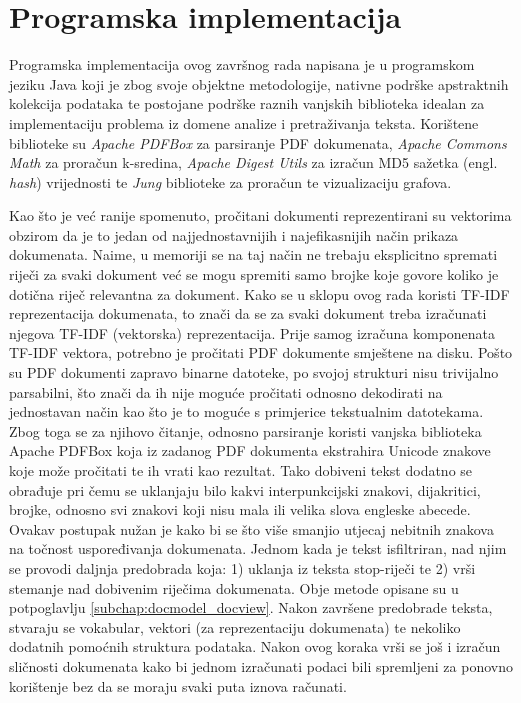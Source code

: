 \documentclass[times, utf8, zavrsni, numeric]{fer}
\begin{document}
\chapter{Programska implementacija}
\label{chap:impl}
Programska implementacija ovog završnog rada napisana je u programskom jeziku Java koji je zbog svoje objektne metodologije, nativne podrške apstraktnih kolekcija podataka te postojane podrške raznih vanjskih biblioteka idealan za implementaciju problema iz domene analize i pretraživanja teksta.
Korištene biblioteke su \textit{Apache PDFBox} za parsiranje PDF dokumenata, \textit{Apache Commons Math} za proračun k-sredina, \textit{Apache Digest Utils} za izračun MD5 sažetka (engl. \textit{hash}) vrijednosti te \textit{Jung} biblioteke za proračun te vizualizaciju grafova. \par
Kao što je već ranije spomenuto, pročitani dokumenti reprezentirani su vektorima obzirom da je to jedan od  najjednostavnijih i najefikasnijih način prikaza dokumenata. Naime, u memoriji se na taj način ne trebaju eksplicitno spremati riječi za svaki dokument već se mogu spremiti samo brojke koje govore koliko je dotična riječ relevantna za dokument. Kako se u sklopu ovog rada koristi TF-IDF reprezentacija dokumenata, to znači da se za svaki dokument treba izračunati njegova TF-IDF (vektorska) reprezentacija. Prije samog izračuna komponenata TF-IDF vektora, potrebno je pročitati PDF dokumente smještene na disku. Pošto su PDF dokumenti zapravo binarne datoteke, po svojoj strukturi nisu trivijalno parsabilni, što znači da ih nije moguće pročitati odnosno dekodirati na jednostavan način kao što je to moguće s primjerice tekstualnim datotekama. Zbog toga se za njihovo čitanje, odnosno parsiranje koristi vanjska biblioteka Apache PDFBox koja iz zadanog PDF dokumenta ekstrahira Unicode znakove koje može pročitati te ih vrati kao rezultat. Tako dobiveni tekst dodatno se obrađuje pri čemu se uklanjaju bilo kakvi interpunkcijski znakovi, dijakritici, brojke, odnosno svi znakovi koji nisu mala ili velika slova engleske abecede. Ovakav postupak nužan je kako bi se što više smanjio utjecaj nebitnih znakova na točnost uspoređivanja dokumenata.
Jednom kada je tekst isfiltriran, nad njim se provodi daljnja predobrada koja: 1) uklanja iz teksta stop-riječi te 2) vrši stemanje nad dobivenim riječima dokumenata. Obje metode opisane su u potpoglavlju
\ref{subchap:docmodel_docview}. Nakon završene predobrade teksta, stvaraju se vokabular, vektori (za reprezentaciju dokumenata) te nekoliko dodatnih pomoćnih struktura podataka. Nakon ovog koraka vrši se još i izračun sličnosti dokumenata kako bi jednom izračunati podaci bili spremljeni za ponovno korištenje bez da se moraju svaki puta iznova računati.
\end{document}
